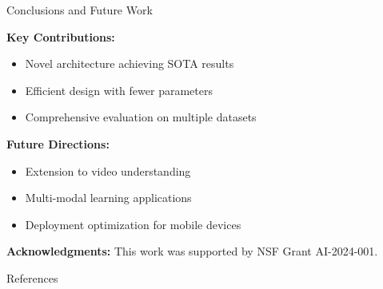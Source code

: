\documentclass[11pt,16:9,handout]{beamer}
\begin{document}
\begin{frame}[allowframebreaks]{Conclusions and Future Work}

            \textbf{Key Contributions:}
\begin{itemize}
  \item Novel architecture achieving SOTA results
  \item Efficient design with fewer parameters
  \item Comprehensive evaluation on multiple datasets
\end{itemize}
            
            \textbf{Future Directions:}
\begin{itemize}
  \item Extension to video understanding
  \item Multi-modal learning applications
  \item Deployment optimization for mobile devices
\end{itemize}
            
            \textbf{Acknowledgments:} This work was supported by NSF Grant AI-2024-001.
            

\end{frame}



\begin{frame}[allowframebreaks]{References}
    \printbibliography
\end{frame}
\end{document}
